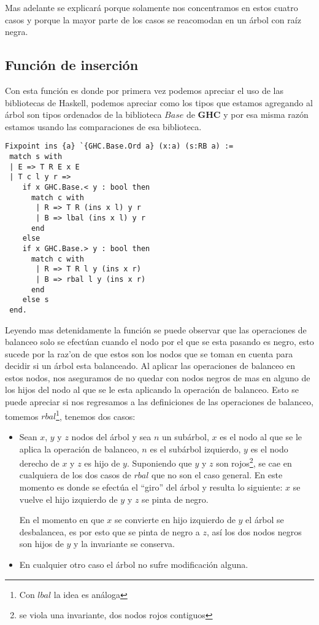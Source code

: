 \documentclass[letterpaper,12pt,oneside]{book}
\theoremstyle{plain}
\theoremstyle{definition}
\theoremstyle{remark}
\begin{document}
Mas adelante se explicar\'a porque solamente nos concentramos en estos cuatro casos y porque la mayor 
parte de los casos se reacomodan en un \'arbol con ra\'iz negra.

\subsection {Funci\'on de inserci\'on}
Con esta funci\'on es donde por primera vez podemos apreciar el uso de las  bibliotecas de Haskell, 
podemos apreciar como los tipos que estamos agregando al \'arbol son tipos ordenados de la biblioteca 
$Base$ de \textbf{GHC} y por esa misma raz\'on estamos usando las comparaciones de esa biblioteca.

\begin{verbatim}
Fixpoint ins {a} `{GHC.Base.Ord a} (x:a) (s:RB a) :=
 match s with
 | E => T R E x E
 | T c l y r =>
    if x GHC.Base.< y : bool then 
      match c with
       | R => T R (ins x l) y r
       | B => lbal (ins x l) y r
      end
    else 
    if x GHC.Base.> y : bool then 
      match c with
       | R => T R l y (ins x r)
       | B => rbal l y (ins x r)
      end
    else s
 end.
\end{verbatim}

Leyendo mas detenidamente la funci\'on se puede observar que las operaciones de balanceo solo se efectúan
cuando el nodo por el que se esta pasando es negro, esto sucede por la raz'on de que estos son los nodos 
que se toman en cuenta para decidir si un \'arbol esta balanceado. Al aplicar las operaciones de balanceo
en estos nodos, nos aseguramos de no quedar con nodos negros de mas en alguno de los hijos del nodo al 
que se le esta aplicando la operación de balanceo. Esto se puede apreciar si nos regresamos a las 
definiciones de las operaciones de balanceo, tomemos $rbal$\footnote{Con $lbal$ la idea es an\'aloga}, 
tenemos dos casos:

\begin{itemize}
    \item Sean $x$, $y$ y $z$ nodos del \'arbol y sea $n$ un subárbol, $x$ es el nodo al que se le aplica
    la operaci\'on de balanceo, $n$ es el subárbol izquierdo, $y$ es el nodo derecho  de $x$ y $z$ es 
    hijo de $y$. Suponiendo que $y$ y $z$ son rojos\footnote{se viola una invariante, dos nodos rojos 
    contiguos}, se cae en cualquiera de los dos casos de $rbal$ que no son el caso general. En este 
    momento es donde se efectúa el ``giro'' del árbol y resulta lo siguiente: $x$ se vuelve el hijo 
    izquierdo de $y$ y $z$ se pinta de negro.
    
    En el momento en que $x$ se convierte en hijo izquierdo de $y$ el \'arbol se desbalancea, es por esto
    que se pinta de negro a $z$, así los dos nodos negros son hijos de $y$ y la invariante se conserva.
    \item En cualquier otro caso el \'arbol no sufre modificaci\'on alguna.
\end{itemize}{}
\end{document}
